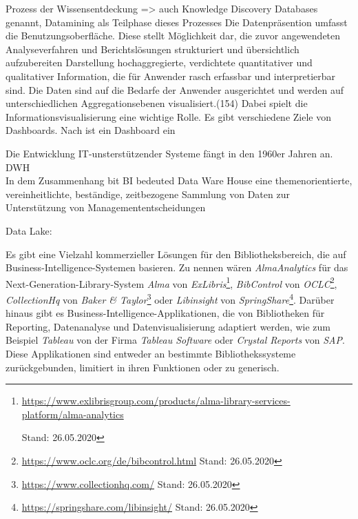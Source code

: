 Prozess der Wissensentdeckung => auch Knowledge Discovery Databases genannt, Datamining als Teilphase dieses Prozesses
Die Datenpräsention umfasst die Benutzungsoberfläche. Diese stellt Möglichkeit dar, die zuvor angewendeten Analyseverfahren und Berichtslösungen strukturiert und übersichtlich aufzubereiten Darstellung hochaggregierte, verdichtete quantitativer und qualitativer Information, die für Anwender rasch erfassbar und interpretierbar sind. Die Daten sind auf die Bedarfe der Anwender ausgerichtet und werden auf unterschiedlichen Aggregationsebenen visualisiert.(154)
Dabei spielt die Informationsvisualisierung eine wichtige Rolle. Es gibt verschiedene Ziele von Dashboards. Nach  ist ein Dashboard ein \cite{few_information_2006}



Die Entwicklung IT-unsterstützender Systeme fängt in den 1960er Jahren an.
\acrfull{DWH}\\
In dem Zusammenhang bit BI bedeuted Data Ware House eine themenorientierte, vereinheitlichte, beständige, zeitbezogene
Sammlung von Daten zur Unterstützung von Managemententscheidungen\cite[vgl.][271]{abts_grundkurs_2017}
        
Data Lake:

        


Es gibt eine Vielzahl kommerzieller Lösungen für den Bibliotheksbereich, die auf Business-Intelligence-Systemen basieren.
Zu nennen wären \textit{AlmaAnalytics} für das Next-Generation-Library-System \textit{Alma} von \textit{ExLibris}\footnote{\url{https://www.exlibrisgroup.com/products/alma-library-services-platform/alma-analytics}

Stand: 26.05.2020}, \textit{BibControl} von \textit{OCLC}\footnote{\url{https://www.oclc.org/de/bibcontrol.html} Stand: 26.05.2020},
\textit{CollectionHq} von \textit{Baker \& Taylor}\footnote{\url{https://www.collectionhq.com/} Stand: 26.05.2020} oder \textit{Libinsight} von \textit{SpringShare}\footnote{\url{https://springshare.com/libinsight/} Stand: 26.05.2020}.
Darüber hinaus gibt es Business-Intelligence-Applikationen, die von
Bibliotheken für Reporting, Datenanalyse und Datenvisualisierung adaptiert werden,
wie zum Beispiel \textit{Tableau} von der Firma \textit{Tableau Software} oder
\textit{Crystal Reports} von \textit{SAP}.
Diese Applikationen sind entweder
an bestimmte Bibliothekssysteme zurückgebunden, limitiert in ihren
Funktionen\cite{golas_statistische_2018} oder zu generisch.


